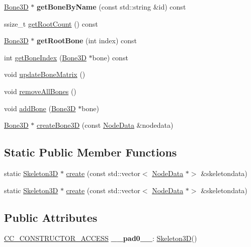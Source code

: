 \begin{DoxyCompactItemize}
\hyperlink{classBone3D}{Bone3D} $\ast$ {\bfseries get\+Bone\+By\+Name} (const std\+::string \&id) const
\item 
ssize\+\_\+t \hyperlink{classSkeleton3D_affbb06a719abb420aa4ca170a153d3ab}{get\+Root\+Count} () const
\item 
\mbox{\label{classSkeleton3D_a4659f6d44f550ddba48fdec6d3ade4cb}} 
\hyperlink{classBone3D}{Bone3D} $\ast$ {\bfseries get\+Root\+Bone} (int index) const
\item 
int \hyperlink{classSkeleton3D_a0496264966b5aa0b32bb769f3d2db8e9}{get\+Bone\+Index} (\hyperlink{classBone3D}{Bone3D} $\ast$bone) const
\item 
void \hyperlink{classSkeleton3D_aaf4bd03372f7be1293cc4d62406127a2}{update\+Bone\+Matrix} ()
\item 
void \hyperlink{classSkeleton3D_aff81f1622948dcffb60ee17c022f425e}{remove\+All\+Bones} ()
\item 
void \hyperlink{classSkeleton3D_a73a1f94a7e99d7a06c4a078203a6f793}{add\+Bone} (\hyperlink{classBone3D}{Bone3D} $\ast$bone)
\item 
\hyperlink{classBone3D}{Bone3D} $\ast$ \hyperlink{classSkeleton3D_a0438e32f80ad0bc06cf0617cc0a7965b}{create\+Bone3D} (const \hyperlink{structNodeData}{Node\+Data} \&nodedata)
\end{DoxyCompactItemize}
\subsection*{Static Public Member Functions}
\begin{DoxyCompactItemize}
\item 
static \hyperlink{classSkeleton3D}{Skeleton3D} $\ast$ \hyperlink{classSkeleton3D_a909c60d044eadf8a6a5c760c1775276b}{create} (const std\+::vector$<$ \hyperlink{structNodeData}{Node\+Data} $\ast$$>$ \&skeletondata)
\item 
static \hyperlink{classSkeleton3D}{Skeleton3D} $\ast$ \hyperlink{classSkeleton3D_ae4ac91f34067f1ddd048ff99b60bbeb2}{create} (const std\+::vector$<$ \hyperlink{structNodeData}{Node\+Data} $\ast$$>$ \&skeletondata)
\end{DoxyCompactItemize}
\subsection*{Public Attributes}
\begin{DoxyCompactItemize}
\item 
\mbox{\label{classSkeleton3D_a337bb8bbb433ae9c3863c4b548e153d4}} 
\hyperlink{_2cocos2d_2cocos_2base_2ccConfig_8h_a25ef1314f97c35a2ed3d029b0ead6da0}{C\+C\+\_\+\+C\+O\+N\+S\+T\+R\+U\+C\+T\+O\+R\+\_\+\+A\+C\+C\+E\+SS} {\bfseries \+\_\+\+\_\+pad0\+\_\+\+\_\+}\+: \hyperlink{classSkeleton3D}{Skeleton3D}()
\end{DoxyCompactItemize}
